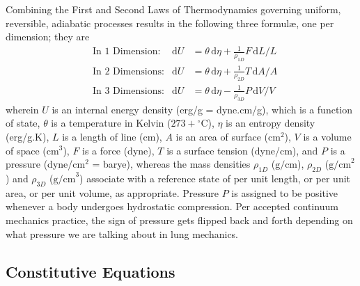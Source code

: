 Combining the First and Second Laws of Thermo\-dynamics governing uniform, reversible, adiabatic processes results in the following three formul\ae, one per dimension; they are
\begin{subequations}
    \label{thermoelasticLaws}
    \begin{align}
    \mbox{} & \text{In 1 Dimension:} & 
    \mathrm{d}U & = \theta \, \mathrm{d} \eta +
    \tfrac{1}{\rho_{1D}} F \, \mathrm{d}L / L
    \label{thermoelastic1Dlaw} \\
    \mbox{} & \text{In 2 Dimensions:} &
    \mathrm{d}U & = \theta \, \mathrm{d} \eta + 
    \tfrac{1}{\rho_{2D}} T \, \mathrm{d}A / \! A
    \label{thermoelastic2Dlaw} \\
    \mbox{} & \text{In 3 Dimensions:} &
    \mathrm{d}U & = \theta \, \mathrm{d} \eta - 
    \tfrac{1}{\rho_{3D}} P \, \mathrm{d}V \! / V \!
    \label{thermoelastic3Dlaw}
    \end{align}
\end{subequations}
wherein $U$ is an internal energy density (erg/g = dyne.cm/g), which is a function of state, $\theta$ is a temperature in Kelvin ($273 + \mbox{}^{\circ}$C), $\eta$ is an entropy density (erg/g.K), $L$ is a length of line (cm), $A$ is an area of surface ($\text{cm}^2$), $V$ is a volume of space ($\text{cm}^3$), $F$ is a force (dyne), $T$ is a surface tension (dyne/cm), and $P$ is a pressure (dyne/$\text{cm}^2$ = barye), whereas the mass densities $\rho_{1D}$ ($\text{g/cm}$), $\rho_{2D}$ ($\text{g/cm}^2$) and $\rho_{3D}$ ($\text{g/cm}^3$) associate with a reference state of per unit length, or per unit area, or per unit volume, as appropriate.  Pressure $P$ is assigned to be positive whenever a body undergoes hydro\-static compression.  Per accepted continuum mechanics practice, the sign of pressure gets flipped back and forth depending on what pressure we are talking about in lung mechanics.

\subsection{Constitutive Equations}

